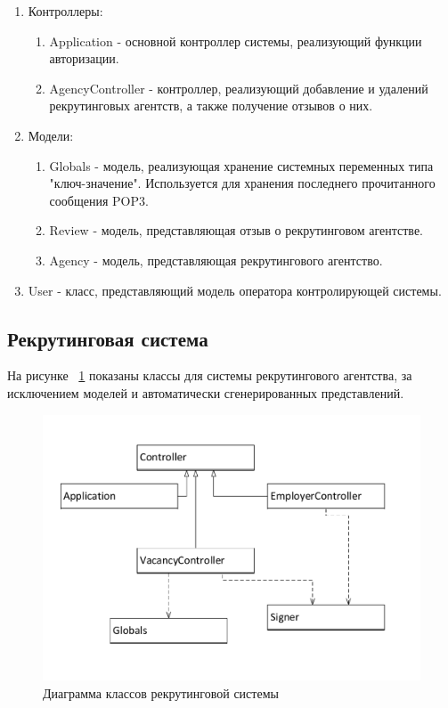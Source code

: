 {\begin{enumerate}
\item Контроллеры:
\begin{enumerate}
\item Application - основной контроллер системы, реализующий функции авторизации.
\item AgencyController - контроллер, реализующий добавление и удалений рекрутинговых агентств, а также получение отзывов о них.
\end{enumerate}
\item Модели:
\begin{enumerate}
\item Globals - модель, реализующая хранение системных переменных типа "ключ-значение". Используется для хранения последнего прочитанного сообщения POP3.
\item Review - модель, представляющая отзыв о рекрутинговом агентстве.
\item Agency - модель, представляющая рекрутингового агентство.
\end{enumerate}
\item User - класс, представляющий модель оператора контролирующей системы.
\end{enumerate}

\subsection{Рекрутинговая система}
На рисунке ~\ref{fig:class-recruiting} показаны классы для системы рекрутингового агентства, за исключением моделей и автоматически сгенерированных представлений.
\begin{figure}[ht]
  \centering
  \includegraphics[width=\textwidth]{include/class-recruiting.pdf}
  \caption{Диаграмма классов рекрутинговой системы}
  \label{fig:class-recruiting}
\end{figure}

}
